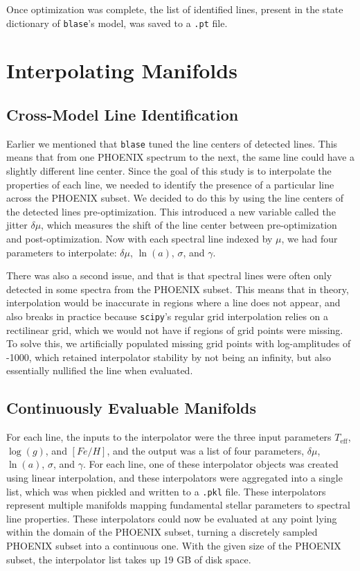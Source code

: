\documentclass[twocolumn]{aastex631}
\begin{document}
Once optimization was complete, the list of identified lines, present in the
state dictionary of \texttt{blase}'s model, was saved to a \texttt{.pt} file.

\section{Interpolating Manifolds}
\subsection{Cross-Model Line Identification}
Earlier we mentioned that \texttt{blase} tuned the line centers of
detected lines. This means that from one PHOENIX spectrum to the next, the
same line could have a slightly different line center. Since the goal of this
study is to interpolate the properties of each line, we needed to identify the
presence of a particular line across the PHOENIX subset. We decided to do
this by using the line centers of the detected lines pre-optimization. This
introduced a new variable called the jitter $\delta\mu$, which measures the shift of the
line center between pre-optimization and post-optimization. Now with each
spectral line indexed by $\mu$, we had four parameters to interpolate:
$\delta\mu$, $\ln(a)$, $\sigma$, and $\gamma$.

There was also a second issue, and that is that spectral lines were often
only detected in some spectra from the PHOENIX subset. This means that in 
theory, interpolation would be inaccurate in regions where a line does not 
appear, and also breaks in practice because \texttt{scipy}'s regular grid
interpolation relies on a rectilinear grid, which we would not have if
regions of grid points were missing. To solve this, we artificially
populated missing grid points with log-amplitudes of -1000, which retained
interpolator stability by not being an infinity, but also essentially 
nullified the line when evaluated.

\subsection{Continuously Evaluable Manifolds}
For each line, the inputs to the interpolator were the three input parameters $T_{\mathrm{eff}}$,
$\log(g)$, and $[Fe/H]$, and the output was a list of four parameters, 
$\delta\mu$, $\ln(a)$, $\sigma$, and $\gamma$. For each line, one of these 
interpolator objects was created using linear interpolation, and these 
interpolators were aggregated into a single list, which was when pickled 
and written to a \texttt{.pkl} file. These interpolators represent multiple 
manifolds mapping fundamental stellar parameters to spectral line properties. 
These interpolators could now be evaluated at any point lying within the 
domain of the PHOENIX subset, turning a discretely sampled PHOENIX subset 
into a continuous one. With the given size of the PHOENIX subset, the 
interpolator list takes up 19 GB of disk space.
\end{document}
